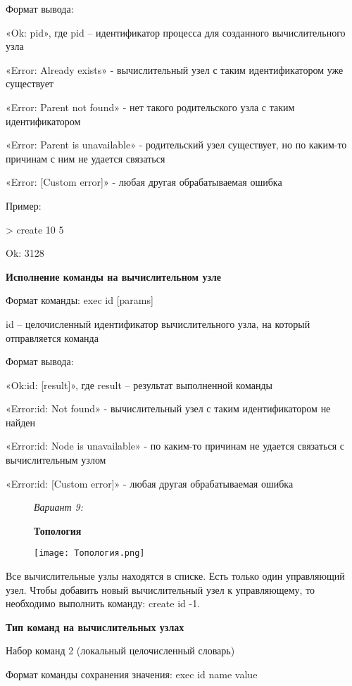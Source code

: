 \documentclass[a4paper, 14pt]{article}
\begin{document}
Формат вывода:

«Ok: pid», где pid – идентификатор процесса для созданного вычислительного узла

«Error: Already exists» - вычислительный узел с таким идентификатором уже существует

«Error: Parent not found» - нет такого родительского узла с таким идентификатором

«Error: Parent is unavailable» - родительский узел существует, но по каким-то причинам с ним не удается связаться

«Error: [Custom error]» - любая другая обрабатываемая ошибка

Пример:

> create 10 5

Ok: 3128\newline

\textbf{Исполнение команды на вычислительном узле}

Формат команды: exec id [params]

id – целочисленный идентификатор вычислительного узла, на который отправляется команда

Формат вывода:

«Ok:id: [result]», где result – результат выполненной команды

«Error:id: Not found» - вычислительный узел с таким идентификатором не найден

«Error:id: Node is unavailable» - по каким-то причинам не удается связаться с вычислительным узлом

«Error:id: [Custom error]» - любая другая обрабатываемая ошибка
\newpage
\begin{figure}

\textit{Вариант 9:}

\textbf{Топология}

    \centering
    \texttt{[image: Топология.png]}
    \label{fig:enter-label}
\end{figure}

Все вычислительные узлы находятся в списке. Есть только один управляющий узел. Чтобы добавить новый вычислительный узел к управляющему, то необходимо выполнить команду: create id -1.\newline

\textbf{Тип команд на вычислительных узлах}

Набор команд 2 (локальный целочисленный словарь)

Формат команды сохранения значения: exec id name value
\end{document}
